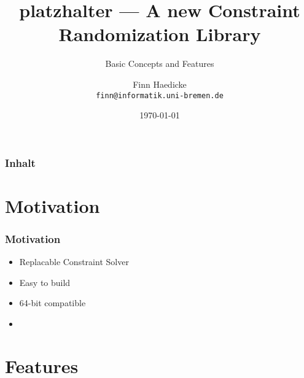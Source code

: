 \documentclass{RAbeamer}
\title[platzhalter]{platzhalter --- A new Constraint Randomization Library}
\subtitle{Basic Concepts and Features}
\author[Finn Haedicke] {Finn Haedicke
  \\  \texttt{finn@informatik.uni-bremen.de}
  }
\date{\today}
\institute[Uni-Bremen]{Institute of Computer Science, University of Bremen}
\begin{document}


\begin{frame}
  \titlepage
\end{frame}

\begin{frame}
  \frametitle{Inhalt}
  \tableofcontents
\end{frame}

\section{Motivation}

\begin{frame}
  \frametitle{Motivation}
  \begin{itemize}
    \item Replacable Constraint Solver
    \item Easy to build
    \item 64-bit compatible
  \item 
  \end{itemize}
\end{frame}

\section{Features}
\end{document}
